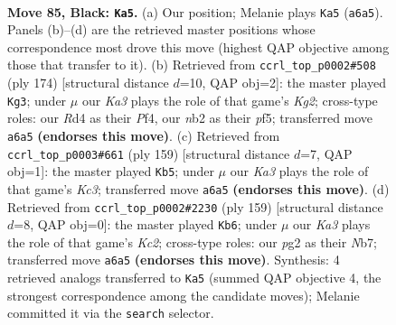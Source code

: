 \documentclass[11pt]{article}
\begin{document}
\clearpage

\begin{figure}[p]\centering
\begin{subfigure}{0.46\textwidth}\centering
\resizebox{\linewidth}{!}{%
\newchessgame
\chessboard[
  setfen={1R6/8/k4K2/8/3r4/8/1N4P1/8 b - - 35 85},
  showmover=false,
  pgfstyle=straightmove, color=movearrow, markmove={a6-a5}
]}
\caption{}
\end{subfigure}\hfill
\begin{subfigure}{0.46\textwidth}\centering
\resizebox{\linewidth}{!}{%
\newchessgame
\chessboard[
  setfen={8/6k1/4R3/5p1r/5P2/8/6K1/8 w - - 3 88},
  showmover=false,
  pgfstyle=straightmove, color=movearrow, markmove={g2-g3}
]}
\caption{}
\end{subfigure}
\\[4pt]
\begin{subfigure}{0.46\textwidth}\centering
\resizebox{\linewidth}{!}{%
\newchessgame
\chessboard[
  setfen={8/R7/2k5/7p/N7/4K3/7r/8 b - - 2 80},
  showmover=false,
  pgfstyle=straightmove, color=movearrow, markmove={c6-b5}
]}
\caption{}
\end{subfigure}\hfill
\begin{subfigure}{0.46\textwidth}\centering
\resizebox{\linewidth}{!}{%
\newchessgame
\chessboard[
  setfen={8/1nk5/8/8/K7/8/6r1/1N1R4 b - - 14 80},
  showmover=false,
  pgfstyle=straightmove, color=movearrow, markmove={c7-b6}
]}
\caption{}
\end{subfigure}
\caption{\textbf{Move 85, Black: \texttt{Ka5}.} (a) Our position; Melanie plays \texttt{Ka5} (\texttt{a6a5}). Panels (b)--(d) are the retrieved master positions whose correspondence most drove this move (highest QAP objective among those that transfer to it). (b) Retrieved from \texttt{ccrl\_top\_p0002\#508} (ply 174) [structural distance $d$=10, QAP obj=2]: the master played \texttt{Kg3}; under $\mu$ our \emph{Ka3} plays the role of that game's \emph{Kg2}; cross-type roles: our \emph{R}d4 as their \emph{P}f4, our \emph{n}b2 as their \emph{p}f5; transferred move \texttt{a6a5} \textbf{(endorses this move)}. (c) Retrieved from \texttt{ccrl\_top\_p0003\#661} (ply 159) [structural distance $d$=7, QAP obj=1]: the master played \texttt{Kb5}; under $\mu$ our \emph{Ka3} plays the role of that game's \emph{Kc3}; transferred move \texttt{a6a5} \textbf{(endorses this move)}. (d) Retrieved from \texttt{ccrl\_top\_p0002\#2230} (ply 159) [structural distance $d$=8, QAP obj=0]: the master played \texttt{Kb6}; under $\mu$ our \emph{Ka3} plays the role of that game's \emph{Kc2}; cross-type roles: our \emph{p}g2 as their \emph{N}b7; transferred move \texttt{a6a5} \textbf{(endorses this move)}. Synthesis: 4 retrieved analogs transferred to \texttt{Ka5} (summed QAP objective 4, the strongest correspondence among the candidate moves); Melanie committed it via the \texttt{search} selector.}
\label{fig:thought-m169}
\end{figure}
\end{document}
